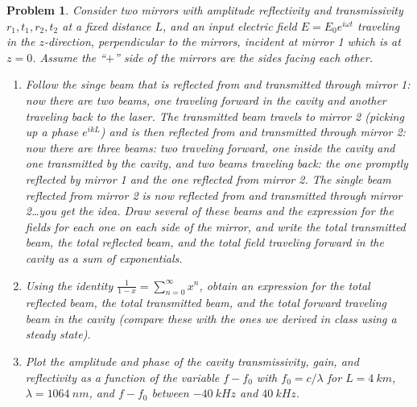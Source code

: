 \documentclass{article}
\newtheorem{plm}{Problem}
\begin{document}
\begin{plm}
  Consider two mirrors with amplitude reflectivity and transmissivity $r_{1}, t_{1}, r_{2}, t_{2}$ at a fixed distance $L$,
  and an input electric field $E = E_{0}e^{i\omega t}$ traveling in the $z$-direction, perpendicular to the mirrors,
  incident at mirror 1 which is at $z = 0$.
  Assume the ``$+$'' side of the mirrors are the sides facing each other.
  \begin{enumerate}
  \item Follow the singe beam that is reflected from and transmitted through mirror 1:
    now there are two beams, one traveling forward in the cavity and another traveling back to the laser.
    The transmitted beam travels to mirror 2 (picking up a phase $e^{ikL}$) and is then reflected from and transmitted through mirror 2:
    now there are three beams: two traveling forward, one inside the cavity and one transmitted by the cavity,
    and two beams traveling back: the one promptly reflected by mirror 1 and the one reflected from mirror 2.
    The single beam reflected from mirror 2 is now reflected from and transmitted through mirror 2\ldots you get the idea.
    Draw several of these beams and the expression for the fields for each one on each side of the mirror, and write the total transmitted beam,
    the total reflected beam, and the total field traveling forward in the cavity as a sum of exponentials.
  \item Using the identity $\frac{1}{1 - x} = \sum_{n = 0}^{\infty}x^{n}$, obtain an expression for the total reflected beam,
    the total transmitted beam, and the total forward traveling beam in the cavity
    (compare these with the ones we derived in class using a steady state).
  \item Plot the amplitude and phase of the cavity transmissivity, gain, and reflectivity as a function of the variable $f - f_{0}$
    with $f_{0} = c / \lambda$ for $L = \SI{4}{km}$, $\lambda = \SI{1064}{nm}$, and $f - f_{0}$ between $\SI{-40}{kHz}$ and $\SI{40}{kHz}$.
  \end{enumerate}
\end{plm}
\end{document}
